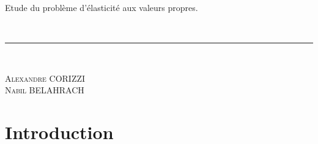 \documentclass[a4paper,11pt]{article}   %
\begin{document}
\begin{titlepage}
    \begin{minipage}[c]{0.90\linewidth} %
     \vspace{1mm}
	{\Huge	  
	   Etude du problème d'élasticité aux valeurs propres.
	}\\
	\vspace{1mm}
   \end{minipage}
    \\
\rule{\linewidth}{0.8mm}\vspace{6mm}\\
%
\vfill
\vspace{3cm}
   \begin{minipage}[c]{.46\linewidth}
	{\normalsize 
		\begin{flushleft}
		\vspace{2mm}		 
		\textsc{Alexandre CORIZZI}\\
		\textsc{Nabil BELAHRACH}\\
		
		\vspace{0.5cm}        
		\end{flushleft}
	}
   \end{minipage}
\hfill
\hspace{15mm}
   \begin{minipage}[c]{.46\linewidth}
	{\normalsize 
		\begin{flushright}

		\end{flushright}
	}
   \end{minipage}
   
 

\end{titlepage}

\newpage
\section{Introduction}
\end{document}
